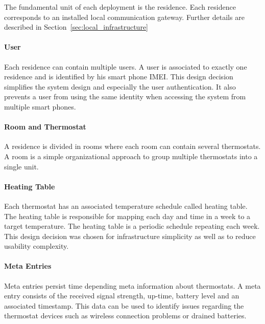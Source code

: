 The fundamental unit of each deployment is the residence. Each residence corresponds to an installed local communication gateway. Further details are described in Section~\ref{sec:local_infrastructure}

\paragraph{User}

Each residence can contain multiple users. A user is associated to exactly one residence and is identified by his smart phone IMEI. This design decision simplifies the system design and especially the user authentication. It also prevents a user from using the same identity when accessing the system from multiple smart phones.

\paragraph{Room and Thermostat}
A residence is divided in rooms where each room can contain several thermostats. A room is a simple organizational approach to group multiple thermostats into a single unit.

\paragraph{Heating Table}

Each thermostat has an associated temperature schedule called heating table.
The heating table is responsible for mapping each day and time in a week to a target temperature. The heating table is a periodic schedule repeating each week.
This design decision was chosen for infrastructure simplicity as well as to reduce usability complexity.

\paragraph{Meta Entries}

Meta entries persist time depending meta information about thermostats. A meta entry consists of the received signal strength, up-time, battery level and an associated timestamp. This data can be used to identify issues regarding the thermostat devices such as wireless connection problems or drained batteries.